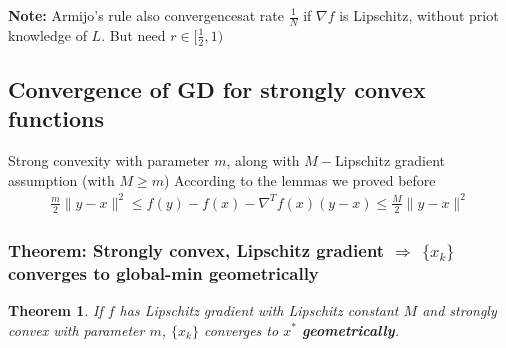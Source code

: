 \documentclass[11pt,a4paper]{article}
\newtheorem{theorem}{Theorem}
\begin{document}
\textbf{Note: }Armijo's rule also convergencesat rate $\frac{1}{N}$ if $\nabla f$ is Lipschitz, without priot knowledge of $L$. But need $r\in[\frac{1}{2},1)$


\subsection{Convergence of GD for strongly convex functions}
Strong convexity with parameter $m$, along with $M-$Lipschitz gradient assumption (with $M\geq m$)
According to the lemmas we proved before
\begin{equation}
    \begin{aligned}
        \frac{m}{2}\|y-x\|^2\leq f(y)-f(x)-\nabla^T f(x)(y-x)\leq \frac{M}{2}\|y-x\|^2
    \end{aligned}
    \nonumber
\end{equation}

\subsubsection{Theorem: Strongly convex, Lipschitz gradient $\Rightarrow$ $\{x_k\}$ converges to global-min geometrically}
\begin{theorem}
    If $f$ has Lipschitz gradient with Lipschitz constant $M$ and strongly convex with parameter $m$, $\{x_k\}$ converges to $x^*$ \textbf{geometrically}.
\end{theorem}
\end{document}

